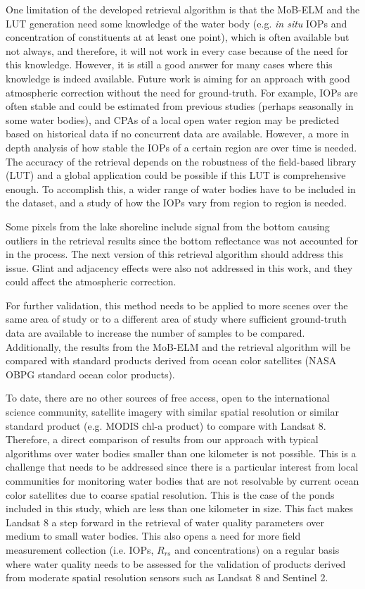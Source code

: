 \documentclass[onecolumn,3p,letterpaper,11pt]{elsarticle}
\begin{document}
One limitation of the developed retrieval algorithm is that the MoB-ELM and the LUT generation need some knowledge of the water body (e.g. {\it in situ} IOPs and concentration of constituents at at least one point), which is often available but not always, and therefore, it will not work in every case because of the need for this knowledge. However, it is still a good answer for many cases where this knowledge is indeed available. Future work is aiming for an approach with good atmospheric correction without the need for ground-truth. For example, IOPs are often stable and could be estimated from previous studies (perhaps seasonally in some water bodies), and CPAs of a local open water region may be predicted based on historical data if no concurrent data are available. However, a more in depth analysis of how stable the IOPs of a certain region are over time is needed. The accuracy of the retrieval depends on the robustness of the field-based library (LUT) and a global application could be possible if this LUT is comprehensive enough. To accomplish this, a wider range of water bodies have to be included in the dataset, and a study of how the IOPs vary from region to region is needed.

Some pixels from the lake shoreline include signal from the bottom causing outliers in the retrieval results since the bottom reflectance was not accounted for in the process. The next version of this retrieval algorithm should address this issue. Glint and adjacency effects were also not addressed in this work, and they could affect the atmospheric correction.

For further validation, this method needs to be applied to more scenes over the same area of study or to a different area of study where sufficient ground-truth data are available to increase the number of samples to be compared. Additionally, the results from the MoB-ELM and the retrieval algorithm will be compared with standard products derived from ocean color satellites (NASA OBPG standard ocean color products).

To date, there are no other sources of free access, open to the international science community, satellite imagery with similar spatial resolution or similar standard product (e.g. MODIS chl-a product) to compare with Landsat 8. Therefore, a direct comparison of results from our approach with typical algorithms over water bodies smaller than one kilometer is not possible. This is a challenge that needs to be addressed since there is a particular interest from local communities for monitoring water bodies that are not resolvable by current ocean color satellites due to coarse spatial resolution. This is the case of the ponds included in this study, which are less than one kilometer in size. This fact makes Landsat 8 a step forward in the retrieval of water quality parameters over medium to small water bodies. This also opens a need for more field measurement collection (i.e. IOPs, $R_{rs}$ and concentrations) on a regular basis where water quality needs to be assessed for the validation of products derived from moderate spatial resolution sensors such as Landsat 8 and Sentinel 2. 
\end{document}
